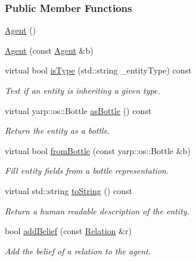 \subsubsection*{Public Member Functions}
\begin{DoxyCompactItemize}
\item 
\hyperlink{group__icubclient__representations_a24a60f1d260bf19a4f7f8a5f36881d3f}{Agent} ()
\item 
\hyperlink{group__icubclient__representations_a82c1a30e19f6f37eb994e258c98dce13}{Agent} (const \hyperlink{group__icubclient__representations_classicubclient_1_1Agent}{Agent} \&b)
\item 
virtual bool \hyperlink{group__icubclient__representations_a0ec60560ae6d20bffb64ce9aa6339894}{is\+Type} (std\+::string \+\_\+entity\+Type) const
\begin{DoxyCompactList}\small\item\em Test if an entity is inheriting a given type. \end{DoxyCompactList}\item 
virtual yarp\+::os\+::\+Bottle \hyperlink{group__icubclient__representations_a7969e73f3ee81ba44e36211807666033}{as\+Bottle} () const
\begin{DoxyCompactList}\small\item\em Return the entity as a bottle. \end{DoxyCompactList}\item 
virtual bool \hyperlink{group__icubclient__representations_abee6123159a9c2d01cd0f6609c8e3415}{from\+Bottle} (const yarp\+::os\+::\+Bottle \&b)
\begin{DoxyCompactList}\small\item\em Fill entity fields from a bottle representation. \end{DoxyCompactList}\item 
virtual std\+::string \hyperlink{group__icubclient__representations_a1fbd9d1acccac0b9fb5a6a1dce6f44f9}{to\+String} () const
\begin{DoxyCompactList}\small\item\em Return a human readable description of the entity. \end{DoxyCompactList}\item 
bool \hyperlink{group__icubclient__representations_a93a948b0365677e594244a75521f2b6a}{add\+Belief} (const \hyperlink{group__icubclient__representations_classicubclient_1_1Relation}{Relation} \&r)
\begin{DoxyCompactList}\small\item\em Add the belief of a relation to the agent. \end{DoxyCompactList}\item 

\end{DoxyCompactItemize}
